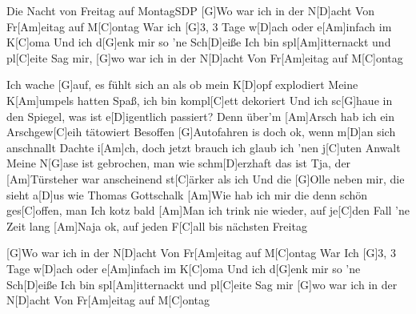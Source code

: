 \documentclass[../main.tex]{subfiles}
\begin{document}
\begin{song}{Die Nacht von Freitag auf Montag}{SDP}{}
[G]Wo war ich in der N[D]acht
Von Fr[Am]eitag auf M[C]ontag
War ich [G]3, 3 Tage w[D]ach
oder e[Am]infach im K[C]oma
Und ich d[G]enk mir so 'ne Sch[D]eiße
Ich bin spl[Am]itternackt und pl[C]eite
Sag mir, [G]wo war ich in der N[D]acht
Von Fr[Am]eitag auf M[C]ontag

Ich wache [G]auf, es fühlt sich an als ob mein K[D]opf explodiert
Meine K[Am]umpels hatten Spaß, ich bin kompl[C]ett dekoriert
Und ich sc[G]haue in den Spiegel, was ist e[D]igentlich passiert?
Denn über'm [Am]Arsch hab ich ein Arschgew[C]eih tätowiert
Besoffen [G]Autofahren is doch ok, wenn m[D]an sich anschnallt
Dachte i[Am]ch, doch jetzt brauch ich glaub ich 'nen j[C]uten Anwalt
Meine N[G]ase ist gebrochen, man wie schm[D]erzhaft das ist
Tja, der [Am]Türsteher war anscheinend st[C]{ä}rker als ich
Und die [G]Olle neben mir, die sieht a[D]us wie Thomas Gottschalk
[Am]Wie hab ich mir die denn schön ges[C]offen, man Ich kotz bald
[Am]Man ich trink nie wieder, auf je[C]den Fall 'ne Zeit lang
[Am]Naja ok, auf jeden F[C]all bis nächsten Freitag

[G]Wo war ich in der N[D]acht
Von Fr[Am]eitag auf M[C]ontag
War Ich [G]3, 3 Tage w[D]ach
oder e[Am]infach im K[C]oma
Und ich d[G]enk mir so 'ne Sch[D]eiße
Ich bin spl[Am]itternackt und pl[C]eite
Sag mir [G]wo war ich in der N[D]acht
Von Fr[Am]eitag auf M[C]ontag
\end{song}
\end{document}
